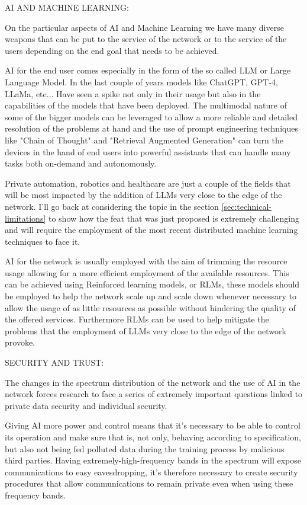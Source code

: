 \bigskip
\noindent
AI AND MACHINE LEARNING:
\label{ssec:ai-ml}

On the particular aspects of AI and Machine Learning we have many diverse weapons that can be put to
the service of the network or to the service of the users depending on the end goal that needs to
be achieved.

AI for the end user comes especially in the form of the so called LLM or Large Language Model. In
the last couple of years models like ChatGPT, GPT-4, LLaMa, etc... Have seen a spike not only in
their usage but also in the capabilities of the models that have been deployed. The multimodal
nature of some of the bigger models can be leveraged to allow a more reliable and detailed
resolution of the problems at hand and the use of prompt engineering techniques like "Chain of
Thought" and "Retrieval Augmented Generation" can turn the devices in the hand of end users into
powerful assistants that can handle many tasks both on-demand and autonomously.

Private automation, robotics and healthcare are just a couple of the fields that will be most
impacted by the addition of LLMs very close to the edge of the network. I'll go back at considering
the topic in the section \ref{sec:technical-limitations} to show how the feat that was just proposed
is extremely challenging and will require the employment of the most recent distributed machine
learning techniques to face it.

AI for the network is usually employed with the aim of trimming the resource usage allowing for a
more efficient employment of the available resources. This can be achieved using Reinforced learning models, or RLMs, these models should be
employed to help the network scale up and scale down whenever necessary to allow the usage of as
little resources as possible without hindering the quality of the offered services. Furthermore RLMs can be
used to help mitigate the problems that the employment of LLMs very close to the edge of the network
provoke.

\bigskip
\noindent
SECURITY AND TRUST:
\label{ssec:security-trust}

The changes in the spectrum distribution of the network and the use of AI in the network forces
research to face a series of extremely important questions linked to private data security and
individual security.

Giving AI more power and control means that it's necessary to be able to
control its operation and make sure that is, not only, behaving according to specification, but also
not being fed polluted data during the training process by malicious third parties. Having extremely-high-frequency bands in the spectrum will expose communications to easy
eavesdropping, it's therefore necessary to create security procedures that allow communications to
remain private even when using these frequency bands.

